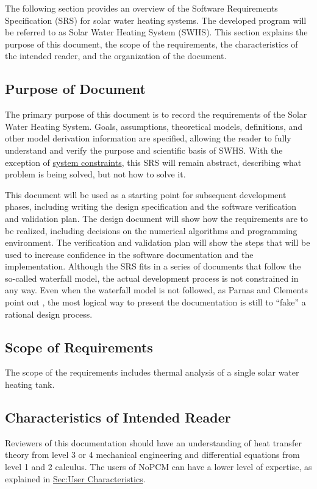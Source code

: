 \documentclass[12pt]{article}
\begin{document}
The following section provides an overview of the Software Requirements Specification (SRS) for solar water heating systems. The developed program will be referred to as Solar Water Heating System (SWHS). This section explains the purpose of this document, the scope of the requirements, the characteristics of the intended reader, and the organization of the document.

\subsection{Purpose of Document}
\label{Sec:DocPurpose}
The primary purpose of this document is to record the requirements of the Solar Water Heating System. Goals, assumptions, theoretical models, definitions, and other model derivation information are specified, allowing the reader to fully understand and verify the purpose and scientific basis of SWHS. With the exception of \hyperref[Sec:SysConstraints]{system constraints}, this SRS will remain abstract, describing what problem is being solved, but not how to solve it.

This document will be used as a starting point for subsequent development phases, including writing the design specification and the software verification and validation plan. The design document will show how the requirements are to be realized, including decisions on the numerical algorithms and programming environment. The verification and validation plan will show the steps that will be used to increase confidence in the software documentation and the implementation. Although the SRS fits in a series of documents that follow the so-called waterfall model, the actual development process is not constrained in any way. Even when the waterfall model is not followed, as Parnas and Clements point out \cite{parnasClements1986}, the most logical way to present the documentation is still to ``fake'' a rational design process.

\subsection{Scope of Requirements}
\label{Sec:ReqsScope}
The scope of the requirements includes thermal analysis of a single solar water heating tank.

\subsection{Characteristics of Intended Reader}
\label{Sec:ReaderChars}
Reviewers of this documentation should have an understanding of heat transfer theory from level 3 or 4 mechanical engineering and differential equations from level 1 and 2 calculus. The users of NoPCM can have a lower level of expertise, as explained in \hyperref[Sec:UserChars]{Sec:User Characteristics}.
\end{document}
